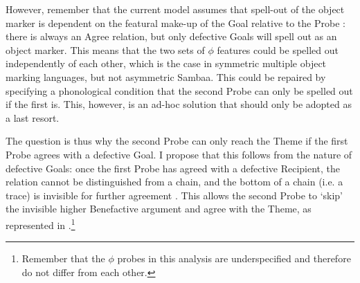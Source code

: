 \documentclass[output=paper
,modfonts
,nonflat]{langsci/langscibook}
\begin{document}
\begin{exe}
\end{exe} 

However, remember that the current model assumes that spell-out of the object marker is dependent on the featural make-up of the Goal relative to the Probe \citep{Roberts2010, Iorio2014, Van_der_Wal2015}: there is always an Agree relation, but only defective Goals will spell out as an object marker. This means that the two sets of $\phi$ features could be spelled out independently of each other, which is the case in symmetric multiple object marking languages, but not asymmetric Sambaa. This could be repaired by specifying a phonological condition that the second Probe can only be spelled out if the first is. This, however, is an ad-hoc solution that should only be adopted as a last resort. 

The question is thus why the second Probe can only reach the Theme if the first Probe agrees with a defective Goal. I propose that this follows from the nature of defective Goals: once the first Probe has agreed with a defective Recipient, the relation cannot be distinguished from a chain, and the bottom of a chain (i.e. a trace) is invisible for further agreement \citep{Chomsky2000, Chomsky2001}. This allows the second Probe to ‘skip’ the invisible higher Benefactive argument and agree with the Theme, as represented in .\footnote{Remember that the $\phi$ probes in this analysis are underspecified and therefore do not differ from each other.} 
 
\begin{exe}
\end{exe} 
\end{document}
